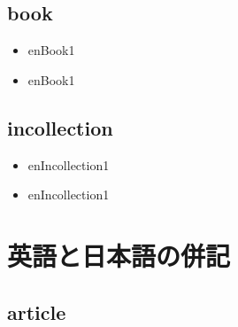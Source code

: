 \documentclass[10pt, a4paper]{jsarticle}
\newcommand{\putlst}[1]{
  \noindent\makebox[\linewidth]{\rule{\linewidth}{0.4pt}}\vspace{-1.5zw}
  \vspace{-1.8zw}
  \noindent\makebox[\linewidth]{\rule{\linewidth}{0.4pt}}\vspace{0.5zw}\par
}
\begin{document}
\subsection{book}

\putlst{bib/enbook.bib}

\begin{bibunit}[IEEJtran]
  \begin{itemize}
    \item enBook1 \cite{enBook1}
  \end{itemize}
  {\small {}}
\end{bibunit}
\begin{bibunit}[jIEEEtran]
  \begin{itemize}
    \item enBook1 \cite{enBook1}
  \end{itemize}
  {\small {}}
\end{bibunit}

\subsection{incollection}

\putlst{bib/enincollection.bib}

\begin{bibunit}[IEEJtran]
  \begin{itemize}
    \item enIncollection1 \cite{enIncollection1}
  \end{itemize}
  {\small {}}
\end{bibunit}
\begin{bibunit}[jIEEEtran]
  \begin{itemize}
    \item enIncollection1 \cite{enIncollection1}
  \end{itemize}
  {\small {}}
\end{bibunit}


\clearpage
\section{英語と日本語の併記}

\subsection{article}

\putlst{bib/ejarticle.bib}
\end{document}
